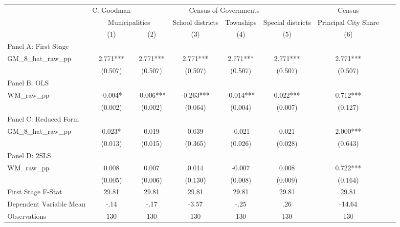  \begin{tabular}{l*{8}{c}} \toprule
&\multicolumn{1}{c}{C. Goodman}&\multicolumn{4}{c}{Census of Governments}&\multicolumn{1}{c}{Census}\\\cmidrule(lr){2-2}\cmidrule(lr){3-6}\cmidrule(lr){7-7}
&\multicolumn{2}{c}{Municipalities}&\multicolumn{1}{c}{School districts}&\multicolumn{1}{c}{Townships}&\multicolumn{1}{c}{Special districts}&\multicolumn{1}{c}{Principal City Share}\\\cmidrule(lr){2-3}\cmidrule(lr){4-6}\cmidrule(lr){7-7}
&\multicolumn{1}{c}{(1)}&\multicolumn{1}{c}{(2)}&\multicolumn{1}{c}{(3)}&\multicolumn{1}{c}{(4)}&\multicolumn{1}{c}{(5)}&\multicolumn{1}{c}{(6)}\\
\cmidrule(lr){1-7}
\multicolumn{6}{l}{Panel A: First Stage}\\
\cmidrule(lr){1-7}
GM\_8\_hat\_raw\_pp &    2.771***&    2.771***&    2.771***&    2.771***&    2.771***&    2.771***\\
                &  (0.507)   &  (0.507)   &  (0.507)   &  (0.507)   &  (0.507)   &  (0.507)   \\
\cmidrule(lr){1-7}
\multicolumn{6}{l}{Panel B: OLS}\\
\cmidrule(lr){1-7}
WM\_raw\_pp       &   -0.004*  &   -0.006***&   -0.263***&   -0.014***&    0.022***&    0.712***\\
                &  (0.002)   &  (0.002)   &  (0.064)   &  (0.004)   &  (0.007)   &  (0.127)   \\
\cmidrule(lr){1-7}
\multicolumn{6}{l}{Panel C: Reduced Form}\\
\cmidrule(lr){1-7}
GM\_8\_hat\_raw\_pp &    0.023*  &    0.019   &    0.039   &   -0.021   &    0.021   &    2.000***\\
                &  (0.013)   &  (0.015)   &  (0.365)   &  (0.026)   &  (0.028)   &  (0.643)   \\
\cmidrule(lr){1-7}
\multicolumn{6}{l}{Panel D: 2SLS}\\
\cmidrule(lr){1-7}
WM\_raw\_pp       &    0.008   &    0.007   &    0.014   &   -0.007   &    0.008   &    0.722***\\
                &  (0.005)   &  (0.006)   &  (0.130)   &  (0.008)   &  (0.009)   &  (0.164)   \\
\midrule
First Stage F-Stat&    29.81   &    29.81   &    29.81   &    29.81   &    29.81   &    29.81   \\
Dependent Variable Mean&     -.14   &     -.17   &    -3.57   &     -.25   &      .26   &   -14.64   \\
Observations    &      130   &      130   &      130   &      130   &      130   &      130   \\
       \bottomrule \end{tabular}
